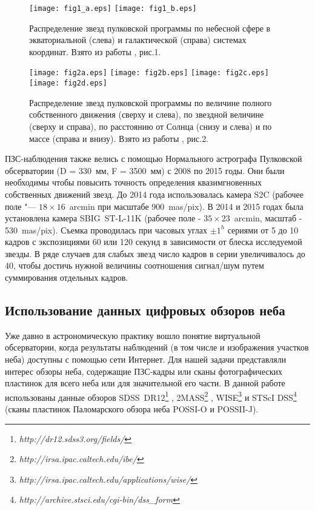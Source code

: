 \begin{figure}[h]
\centering
\texttt{[image: fig1\_a.eps]}
\texttt{[image: fig1\_b.eps]}
\caption{Распределение звезд пулковской программы по небесной сфере в экваториальной (слева) и галактической (справа) системах координат. Взято из работы \cite{2015AstL...41..833K}, рис.1.}
 \label{fig:15alloc}
\end{figure}

\begin{figure}[h]
\centering
\texttt{[image: fig2a.eps]}
\texttt{[image: fig2b.eps]}
\texttt{[image: fig2c.eps]}
\texttt{[image: fig2d.eps]}
\caption{Распределение звезд пулковской программы по величине полного собственного движения (сверху и слева), по звездной величине (сверху и справа), по расстоянию от Солнца (снизу и слева) и по массе (справа и внизу). Взято из работы \cite{2015AstL...41..833K}, рис.2.}
\label{fig:15hist}
\end{figure}

ПЗС-наблюдения также велись с помощью Нормального астрографа Пулковской обсерватории (D = 330~мм, F = 3500~мм) с 2008 по 2015 годы. Они были необходимы чтобы повысить точность определения квазимгновенных собственных движений звезд.  До 2014 года использовалась камера S2C (рабочее поле "--- $18\times16$~arcmin при масштабе 900~mas/pix). В 2014 и 2015 годах была установлена камера \mbox{SBIG ST-L-11K} (рабочее поле - $35\times23$~arcmin, масштаб - 530~mas/pix). Съемка проводилась при часовых углах $\pm1^h$ сериями от 5 до 10 кадров с экспозициями 60 или 120 секунд в зависимости от блеска исследуемой звезды. В ряде случаев для слабых звезд число кадров в серии увеличивалось до 40, чтобы достичь нужной величины соотношения сигнал/шум путем суммирования отдельных кадров.
\subsection{Использование данных цифровых обзоров неба} \label{subsec:ch3/sect2/sub2}
Уже давно в астрономическую практику вошло понятие \glqq виртуальной обсерватории\grqq , когда результаты наблюдений (в том числе и изображения участков неба) доступны с помощью сети Интернет.  Для нашей задачи представляли интерес обзоры неба, содержащие ПЗС-кадры или сканы фотографических пластинок для всего неба или для значительной его части. В данной работе использованы данные обзоров SDSS~DR12\footnote{\textit{http://dr12.sdss3.org/fields/}} \cite{2015ApJS..219...12A}, 2MASS\footnote{\textit{http://irsa.ipac.caltech.edu/ibe/}} \cite{2003tmc..book.....C}, WISE\footnote{\textit{http://irsa.ipac.caltech.edu/applications/wise/}} \cite{2010AJ....140.1868W} и STScI DSS\footnote{\textit{http://archive.stsci.edu/cgi-bin/dss\_form}} \cite{1998asal.confE...3L} (сканы пластинок Паломарского обзора неба POSSI-O и POSSII-J).

